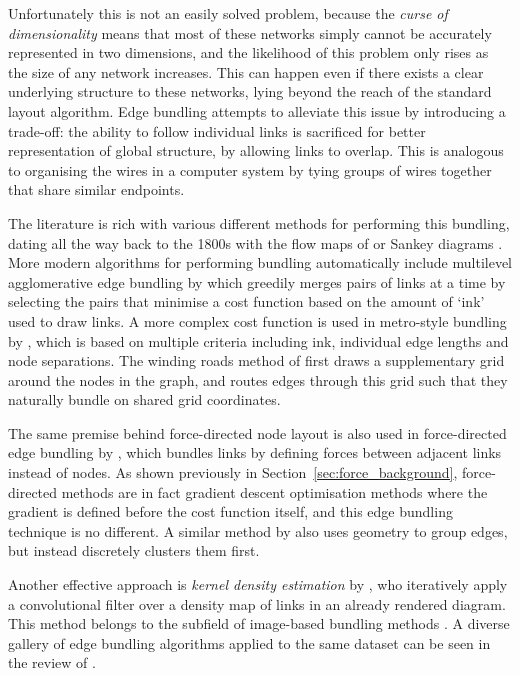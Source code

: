 Unfortunately this is not an easily solved problem, because the \textit{curse of dimensionality} \citep{Friedman2001Local} means that most of these networks simply cannot be accurately represented in two dimensions, and the likelihood of this problem only rises as the size of any network increases. This can happen even if there exists a clear underlying structure to these networks, lying beyond the reach of the standard layout algorithm.
Edge bundling attempts to alleviate this issue by introducing a trade-off: the ability to follow individual links is sacrificed for better representation of global structure, by allowing links to overlap.
This is analogous to organising the wires in a computer system by tying groups of wires together that share similar endpoints.

The literature is rich with various different methods for performing this bundling, dating all the way back to the 1800s with the flow maps of \citet{Minard1862} or Sankey diagrams \citep{Sankey1896}.
More modern algorithms for performing bundling automatically include multilevel agglomerative edge bundling by \citet{Gansner2011} which greedily merges pairs of links at a time by selecting the pairs that minimise a cost function based on the amount of `ink' used to draw links. A more complex cost function is used in metro-style bundling by \citet{Pupyrev2016}, which is based on multiple criteria including ink, individual edge lengths and node separations. 
The winding roads method of \citet{Lambert2010} first draws a supplementary grid around the nodes in the graph, and routes edges through this grid such that they naturally bundle on shared grid coordinates.

The same premise behind force-directed node layout is also used in force-directed edge bundling by \citet{Holten2009}, which bundles links by defining forces between adjacent links instead of nodes. As shown previously in Section~\ref{sec:force_background}, force-directed methods are in fact gradient descent optimisation methods where the gradient is defined before the cost function itself, and this edge bundling technique is no different.
A similar method by \citet{Cui2008} also uses geometry to group edges, but instead discretely clusters them first. 

Another effective approach is \emph{kernel density estimation} by \citet{Hurter2012}, who iteratively apply a convolutional filter over a density map of links in an already rendered diagram. This method belongs to the subfield of image-based bundling methods \citep{Lhuillier2017,Telea2018}. A diverse gallery of edge bundling algorithms applied to the same dataset can be seen in the review of \citet{Lhuillier2017}.

